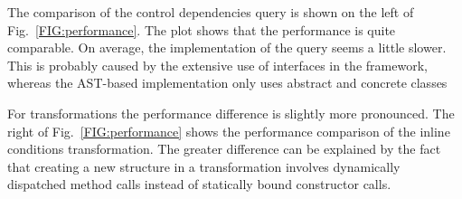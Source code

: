 The comparison of the control dependencies query is shown on the left of Fig.~\ref{FIG:performance}.
The plot shows that the performance is quite comparable.
On average, the \name implementation of the query seems a little slower.
This is probably caused by the extensive use of interfaces in the \name framework, whereas the AST-based implementation only uses abstract and concrete classes

For transformations the performance difference is slightly more pronounced.
The right of Fig.~\ref{FIG:performance} shows the performance comparison of the inline conditions transformation. 
The greater difference can be explained by the fact that creating a new structure in a \name transformation involves dynamically dispatched method calls instead of statically bound constructor calls. 




